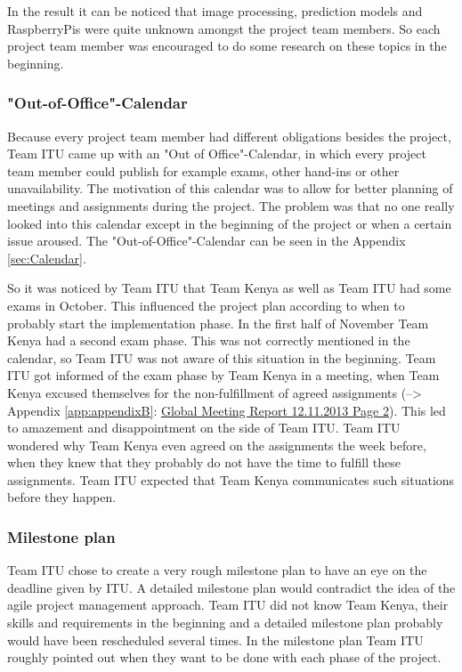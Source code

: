 In the result it can be noticed that image processing, prediction models and RaspberryPis were quite unknown amongst the project team members. So each project team member was encouraged to do some research on these topics in the beginning.

\subsubsection{"Out-of-Office"-Calendar}

Because every project team member had different obligations besides the project, Team ITU came up with an "Out of Office"-Calendar, in which every project team member could publish for example exams, other hand-ins or other unavailability. The motivation of this calendar was to allow for better planning of meetings and assignments during the project. The problem was that no one really looked into this calendar except in the beginning of the project or when a certain issue aroused. The "Out-of-Office"-Calendar can be seen in the Appendix \ref{sec:Calendar}.

So it was noticed by Team ITU that Team Kenya as well as Team ITU had some exams in October. This influenced the project plan according to when to probably start the implementation phase. In the first half of November Team Kenya had a second exam phase. This was not correctly mentioned in the calendar, so Team ITU was not aware of this situation in the beginning. Team ITU got informed of the exam phase by Team Kenya in a meeting, when Team Kenya excused themselves for the non-fulfillment of agreed assignments (--> Appendix \ref{app:appendixB}: \hyperlink{GSD20131112.2}{Global Meeting Report 12.11.2013 Page 2}). This led to amazement and disappointment on the side of Team ITU. Team ITU wondered why Team Kenya even agreed on the assignments the week before, when they knew that they probably do not have the time to fulfill these assignments. Team ITU expected that Team Kenya communicates such situations before they happen.

\subsubsection{Milestone plan}
Team ITU chose to create a very rough milestone plan to have an eye on the deadline given by ITU. A detailed milestone plan would contradict the idea of the agile project management approach. Team ITU did not know Team Kenya, their skills and requirements in the beginning and a detailed milestone plan probably would have been rescheduled several times. In the milestone plan Team ITU roughly pointed out when they want to be done with each phase of the project.

